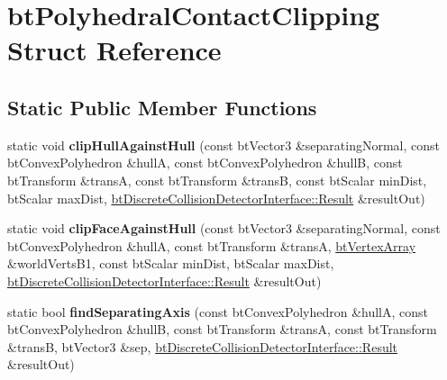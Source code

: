 \hypertarget{structbt_polyhedral_contact_clipping}{\section{bt\+Polyhedral\+Contact\+Clipping Struct Reference}
\label{structbt_polyhedral_contact_clipping}
}
\subsection*{Static Public Member Functions}
\begin{DoxyCompactItemize}
\item 
\hypertarget{structbt_polyhedral_contact_clipping_af26bb1efeae5c9ac16f980f68967cfdc}{static void {\bfseries clip\+Hull\+Against\+Hull} (const bt\+Vector3 \&separating\+Normal, const bt\+Convex\+Polyhedron \&hull\+A, const bt\+Convex\+Polyhedron \&hull\+B, const bt\+Transform \&trans\+A, const bt\+Transform \&trans\+B, const bt\+Scalar min\+Dist, bt\+Scalar max\+Dist, \hyperlink{structbt_discrete_collision_detector_interface_1_1_result}{bt\+Discrete\+Collision\+Detector\+Interface\+::\+Result} \&result\+Out)}\label{structbt_polyhedral_contact_clipping_af26bb1efeae5c9ac16f980f68967cfdc}

\item 
\hypertarget{structbt_polyhedral_contact_clipping_a553be63ab7b19085f37f103ed9276cb7}{static void {\bfseries clip\+Face\+Against\+Hull} (const bt\+Vector3 \&separating\+Normal, const bt\+Convex\+Polyhedron \&hull\+A, const bt\+Transform \&trans\+A, \hyperlink{classbt_aligned_object_array}{bt\+Vertex\+Array} \&world\+Verts\+B1, const bt\+Scalar min\+Dist, bt\+Scalar max\+Dist, \hyperlink{structbt_discrete_collision_detector_interface_1_1_result}{bt\+Discrete\+Collision\+Detector\+Interface\+::\+Result} \&result\+Out)}\label{structbt_polyhedral_contact_clipping_a553be63ab7b19085f37f103ed9276cb7}

\item 
\hypertarget{structbt_polyhedral_contact_clipping_ad5f81176a891d4face2c9954e3a690b3}{static bool {\bfseries find\+Separating\+Axis} (const bt\+Convex\+Polyhedron \&hull\+A, const bt\+Convex\+Polyhedron \&hull\+B, const bt\+Transform \&trans\+A, const bt\+Transform \&trans\+B, bt\+Vector3 \&sep, \hyperlink{structbt_discrete_collision_detector_interface_1_1_result}{bt\+Discrete\+Collision\+Detector\+Interface\+::\+Result} \&result\+Out)}\label{structbt_polyhedral_contact_clipping_ad5f81176a891d4face2c9954e3a690b3}


\end{DoxyCompactItemize}
